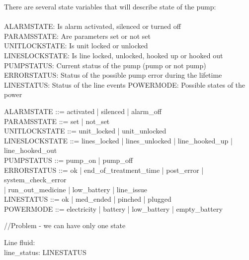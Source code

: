 \documentclass{article}
\begin{document}
	
	There are several state variables that will describe state of the pump:\\
	\\
	
	ALARMSTATE: Is alarm activated, silenced or turned off\\
	PARAMSSTATE: Are parameters set or not set\\
	UNITLOCKSTATE: Is unit locked or unlocked \\
	LINESLOCKSTATE: Is line locked, unlocked, hooked up or hooked out\\
	PUMPSTATUS: Current status of the pump (pump or not pump)\\
	ERRORSTATUS: Status of the possible pump error during the lifetime\\
	LINESTATUS: Status of the line events
	POWERMODE: Possible states of the power
	
	\begin{zed}	
		
		
		ALARMSTATE ::= activated | silenced | alarm\_off \\
		
		PARAMSSTATE ::= set | not\_set \\
	
		UNITLOCKSTATE ::= unit\_locked | unit\_unlocked \\
	
		LINESLOCKSTATE ::= lines\_locked | lines\_unlocked | line\_hooked\_up | line\_hooked\_out \\
		PUMPSTATUS ::= pump\_on | pump\_off \\		
		
		ERRORSTATUS ::= ok | end\_of\_treatment\_time | post\_error | system\_check\_error \\ | run\_out\_medicine | low\_battery | line\_issue \\
		
		LINESTATUS ::= ok | med\_ended | pinched | plugged \\
		
		POWERMODE ::= electricity | battery | low\_battery | empty\_battery \\
	\end{zed}
	
	//Problem - we can have only one state
	
	\begin{schema}{Line}
		fluid: \nat \\
		line\_status: LINESTATUS	
	\end{schema}
	
\end{document}

